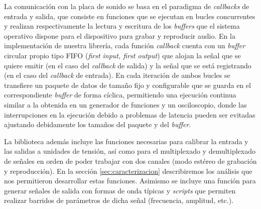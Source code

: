 \documentclass[a4paper,11pt]{article}
\begin{document}
	La comunicación con la placa de sonido se basa en el paradigma de \emph{callbacks} de entrada y salida, que consiste en funciones que se ejecutan en bucles concurrentes y realizan respectivamente la lectura y escritura de los \emph{buffers} que el sistema operativo dispone para el dispositivo para grabar y reproducir audio. En la implementación de nuestra librería, cada función \emph{callback} cuenta con un \emph{buffer} circular propio tipo FIFO (\emph{first input, first output}) que alojan la señal que se quiere emitir (en el caso del \emph{callback} de salida) y la señal que se está registrando (en el caso del \emph{callback} de entrada). En cada iteración de ambos bucles se transfiere un paquete de datos de tamaño fijo y configurable que se guarda en el correspondiente \emph{buffer} de forma cíclica, permitiendo una ejecución continua similar a la obtenida en un generador de funciones y un osciloscopio, donde las interrupciones en la ejecución debido a problemas de latencia pueden ser evitadas ajustando debidamente los tamaños del paquete y del \emph{buffer}.

	La biblioteca además incluye las funciones necesarias para calibrar la entrada y las salidas a unidades de tensión, así como para el multiplexado y demultiplexado de señales en orden de poder trabajar con dos canales (modo estéreo de grabación y reproducción). En la sección \ref{sec:caracterizacion} describiremos los análisis que nos permitieron desarrollar estas funciones. Asimismo se incluye una función para generar señales de salida con formas de onda típicas y \emph{scripts} que permiten realizar barridos de parámetros de dicha señal (frecuencia, amplitud, etc.).
	
\end{document}
